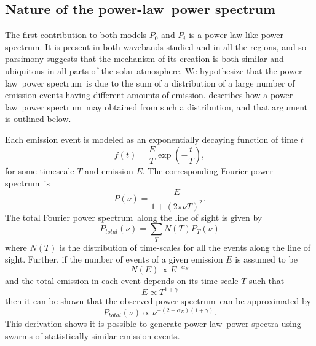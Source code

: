 \documentclass{aastex}
\newcommand{\PS}{power spectrum}
\newcommand{\PL}{power-law}
\newcommand{\Fps}{Fourier \PS}
\begin{document}
\subsection{Nature of the \protect\PL\ \protect\PS}\label{ssec:nplps}

The first contribution to both models $P_{0}$ and $P_{i}$ is a
\PL-like \PS.  It is present in both wavebands studied and in all the
regions, and so parsimony suggests that the mechanism of its creation
is both similar and ubiquitous in all parts of the solar atmosphere.
We hypothesize that the \PL\ \PS\ is due to the sum of a distribution
of a large number of emission events having different amounts of
emission. \cite{2011soca.book.....A} describes how a \PL\ \PS\ may
obtained from such a distribution, and that argument is outlined
below.

Each emission event is modeled as an exponentially decaying function
of time $t$
\begin{equation}
\label{eqn:expdecay}
f(t) = \frac{E}{T}\exp\left(-\frac{t}{T}\right),
\end{equation}
for some timescale $T$ and emission $E$.  The corresponding \Fps\ is
\begin{equation}
\label{eqn:ftexpdecay}
P(\nu) = \frac{E}{1 + (2\pi \nu T)^{2}}.
\end{equation}
The total \Fps\ along the line of sight is given by
\begin{equation}
\label{eqn:sumftexpdecay}
P_{total}(\nu) = \sum_{T}N(T)P_{T}(\nu)
\end{equation}
where $N(T)$ is the distribution of time-scales for all the events
along the line of sight.  Further, if the number of events of a given
emission $E$ is assumed to be
\begin{equation}
\label{eqn:energydistrib}
N(E) \propto E^{-\alpha_{E}}
\end{equation}
and the total emission in each event depends on its time scale $T$
such that
\begin{equation}
\label{eqn:energytime}
E \propto T^{1+\gamma}
\end{equation}
then it can be shown that the observed \PS\ can be
approximated by
\begin{equation}
\label{eqn:finalfps}
P_{total}(\nu) \propto \nu^{-(2-\alpha_{E})(1+\gamma)}.
\end{equation}
This derivation shows it is possible to generate \PL\ power spectra
using swarms of statistically similar emission events.  
\end{document}
